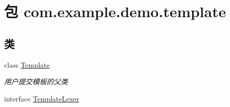 \hypertarget{namespacecom_1_1example_1_1demo_1_1template}{}\section{包 com.\+example.\+demo.\+template}
\label{namespacecom_1_1example_1_1demo_1_1template}
\subsection*{类}
\begin{DoxyCompactItemize}
\item 
class \mbox{\hyperlink{classcom_1_1example_1_1demo_1_1template_1_1_template}{Template}}
\begin{DoxyCompactList}\small\item\em 用户提交模板的父类 \end{DoxyCompactList}\item 
interface \mbox{\hyperlink{interfacecom_1_1example_1_1demo_1_1template_1_1_template_lexer}{Template\+Lexer}}
\end{DoxyCompactItemize}
